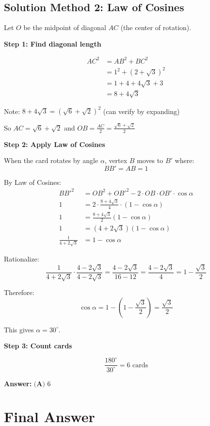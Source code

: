 \documentclass[12pt]{article}
\begin{document}
\subsection*{Solution Method 2: Law of Cosines}

Let $O$ be the midpoint of diagonal $AC$ (the center of rotation).

\textbf{Step 1: Find diagonal length}

\begin{align*}
AC^2 &= AB^2 + BC^2\\
&= 1^2 + (2+\sqrt{3})^2\\
&= 1 + 4 + 4\sqrt{3} + 3\\
&= 8 + 4\sqrt{3}
\end{align*}

Note: $8 + 4\sqrt{3} = (\sqrt{6}+\sqrt{2})^2$ (can verify by expanding)

So $AC = \sqrt{6} + \sqrt{2}$ and $OB = \frac{AC}{2} = \frac{\sqrt{6}+\sqrt{2}}{2}$

\textbf{Step 2: Apply Law of Cosines}

When the card rotates by angle $\alpha$, vertex $B$ moves to $B'$ where:
\[BB' = AB = 1\]

By Law of Cosines:
\begin{align*}
BB'^2 &= OB^2 + OB'^2 - 2 \cdot OB \cdot OB' \cdot \cos\alpha\\
1 &= 2 \cdot \frac{8+4\sqrt{3}}{4} \cdot (1 - \cos\alpha)\\
1 &= \frac{8+4\sqrt{3}}{2}(1-\cos\alpha)\\
1 &= (4+2\sqrt{3})(1-\cos\alpha)\\
\frac{1}{4+2\sqrt{3}} &= 1 - \cos\alpha
\end{align*}

Rationalize:
\[\frac{1}{4+2\sqrt{3}} \cdot \frac{4-2\sqrt{3}}{4-2\sqrt{3}} = \frac{4-2\sqrt{3}}{16-12} = \frac{4-2\sqrt{3}}{4} = 1 - \frac{\sqrt{3}}{2}\]

Therefore:
\[\cos\alpha = 1 - (1 - \frac{\sqrt{3}}{2}) = \frac{\sqrt{3}}{2}\]

This gives $\alpha = 30^\circ$.

\textbf{Step 3: Count cards}

\[\frac{180^\circ}{30^\circ} = 6 \text{ cards}\]

\textbf{Answer: } $\boxed{\textbf{(A) } 6}$

\section*{Final Answer}
\end{document}
